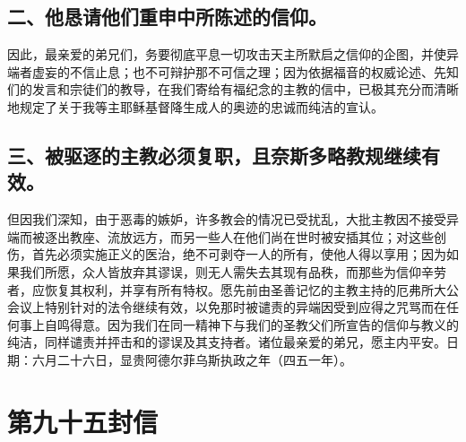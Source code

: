 
\subsection{二、他恳请他们重申中所陈述的信仰。}

因此，最亲爱的弟兄们，务要彻底平息一切攻击天主所默启之信仰的企图，并使异端者虚妄的不信止息；也不可辩护那不可信之理；因为依据福音的权威论述、先知们的发言和宗徒们的教导，在我们寄给有福纪念的主教的信中，已极其充分而清晰地规定了关于我等主耶稣基督降生成人的奥迹的忠诚而纯洁的宣认。\par


\subsection{三、被驱逐的主教必须复职，且奈斯多略教规继续有效。}

但因我们深知，由于恶毒的嫉妒，许多教会的情况已受扰乱，大批主教因不接受异端而被逐出教座、流放远方，而另一些人在他们尚在世时被安插其位；对这些创伤，首先必须实施正义的医治，绝不可剥夺一人的所有，使他人得以享用；因为如果我们所愿，众人皆放弃其谬误，则无人需失去其现有品秩，而那些为信仰辛劳者，应恢复其权利，并享有所有特权。愿先前由圣善记忆的主教主持的厄弗所大公会议上特别针对的法令继续有效，以免那时被谴责的异端因受到应得之咒骂而在任何事上自鸣得意。因为我们在同一精神下与我们的圣教父们所宣告的信仰与教义的纯洁，同样谴责并抨击和的谬误及其支持者。诸位最亲爱的弟兄，愿主内平安。日期：六月二十六日，显贵阿德尔菲乌斯执政之年（四五一年）。\par



\section{第九十五封信}

